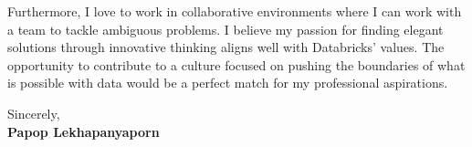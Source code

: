 \documentclass[letterpaper,11pt]{article}
\newcommand{\closing}[1]{
  \vspace{2em}
  Sincerely, \\
  \textbf{#1}
}
\renewcommand{\paragraph}[1]{\par\noindent\setlength{\parskip}{0.5em}\setlength{\parindent}{0pt}#1\par\vspace{1em}}
\begin{document}
\paragraph{
Furthermore, I love to work in collaborative environments where I can work with a team to tackle ambiguous problems.
I believe my passion for finding elegant solutions through innovative thinking aligns well with Databricks’ values.
The opportunity to contribute to a culture focused on pushing the boundaries of what is possible with data would be a perfect match for my professional aspirations.
}

\closing{Papop Lekhapanyaporn}
\end{document}
